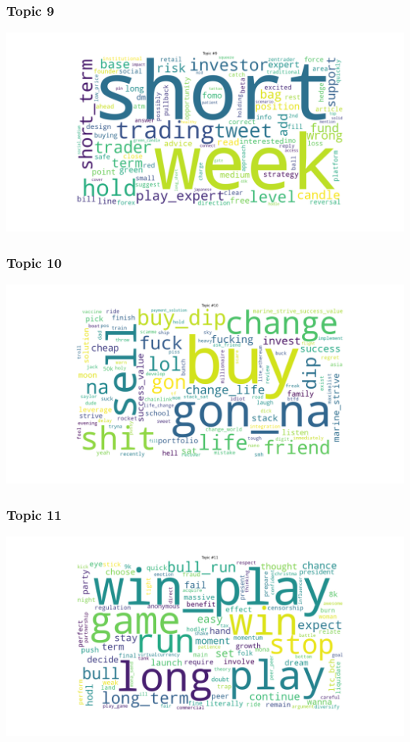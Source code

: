\documentclass[
]{article}
\begin{document}
\hypertarget{topic-9}{%
\subsubsection{Topic 9}\label{topic-9}}

\includegraphics[width=7.8125in,height=\textheight]{images/03 - Topic_9.png}

\hypertarget{topic-10}{%
\subsubsection{Topic 10}\label{topic-10}}

\includegraphics[width=7.8125in,height=\textheight]{images/03 - Topic_10.png}

\hypertarget{topic-11}{%
\subsubsection{Topic 11}\label{topic-11}}

\includegraphics[width=7.8125in,height=\textheight]{images/03 - Topic_11.png}
\end{document}
